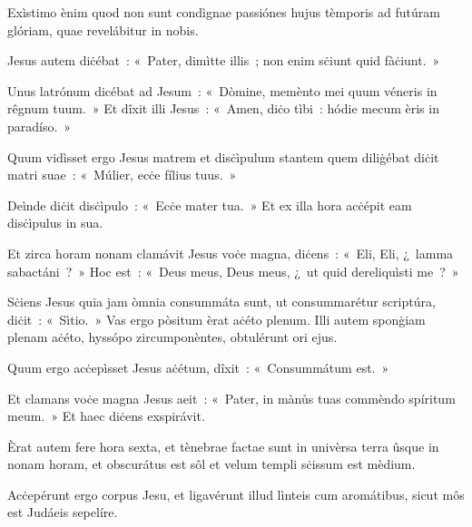 Exìstimo ènim quod non sunt condìgnae passiónes hujus tèmporis ad futúram glóriam, quae revelábitur in nobis. 

\mysteryEnd
{}

Jesus autem diċébat~: «~Pater, dimìtte illis~; non enim sċiunt quid fàċiunt.~» 

Unus latrónum dicébat ad Jesum~: «~Dòmine, memènto mei quum véneris in rêgnum tuum.~» Et dîxit illi Jesus~: «~Amen, diċo tìbi~: hódie mecum èris in paradíso.~» 

Quum vidìsset ergo Jesus matrem et disċìpulum stantem quem diliġébat diċit matri suae~: «~Múlier, ecċe fílius tuus.~» 

Deìnde diċit disċìpulo~: «~Ecċe mater tua.~» Et ex illa hora acċépit eam disċìpulus in sua. 

Et zirca horam nonam clamávit Jesus voċe magna, diċens~: «~Eli, Eli, ¿~lamma sabactáni~?~» Hoc est~: «~Deus meus, Deus meus, ¿~ut quid dereliquìsti me~?~» 

Sċiens Jesus quia jam òmnia consummáta sunt, ut consummarétur scriptúra, diċit~: «~Sìtio.~» Vas ergo pòsitum èrat aċéto plenum. Illi autem sponġiam plenam aċéto, hyssópo zircumponèntes, obtulérunt ori ejus. 

Quum ergo acċepìsset Jesus aċétum, dîxit~: «~Consummátum est.~» 

Et clamans voċe magna Jesus aeit~: «~Pater, in mànůs tuas commèndo spíritum meum.~» Et haec diċens exspirávit. 

Èrat autem fere hora sexta, et tènebrae factae sunt in univèrsa terra ûsque in nonam horam, et obscurátus est sôl et velum templi sċissum est mèdium. 

Acċepérunt ergo corpus Jesu, et ligavérunt illud lìnteis cum aromátibus, sicut môs est Judáeis sepelíre. 

